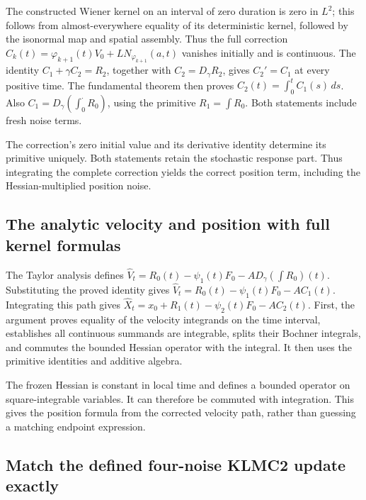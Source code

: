 \documentclass[11pt,a4paper]{report}
\begin{document}
The constructed Wiener kernel on an interval of zero duration is zero in \(L^{2}\); this follows from almost-everywhere equality of its deterministic kernel, followed by the isonormal map and spatial assembly. Thus the full correction \(C_k(t)=\varphi_{k+1}(t)V_0+L N_{\varphi_{k+1}}(a,t)\) vanishes initially and is continuous. The identity \(C_1+\gamma C_2=R_2\), together with \(C_2=D_\gamma R_2\), gives \(C_2\prime=C_1\) at every positive time. The fundamental theorem then proves \(C_2(t)=\int_0^tC_1(s)\,ds\). Also \(C_1=D_\gamma(\int_0^{\cdot}R_0)\), using the primitive \(R_1=\int R_0\). Both statements include fresh noise terms.



The correction’s zero initial value and its derivative identity determine its primitive uniquely. Both statements retain the stochastic response part. Thus integrating the complete correction yields the correct position term, including the Hessian-multiplied position noise.

\subsection{\texorpdfstring{The analytic velocity and position with full kernel formulas}{The analytic velocity and position with full kernel formulas}}
\label{report-step-KineticLangevin-CorrectedStep-lean-3}


The Taylor analysis defines \(\widehat V_t=R_0(t)-\psi_1(t)F_0-A D_\gamma(\int R_0)(t)\). Substituting the proved identity gives \(\widehat V_t=R_0(t)-\psi_1(t)F_0-AC_1(t)\). Integrating this path gives \(\widehat X_t=x_0+R_1(t)-\psi_2(t)F_0-AC_2(t)\). First, the argument proves equality of the velocity integrands on the time interval, establishes all continuous summands are integrable, splits their Bochner integrals, and commutes the bounded Hessian operator with the integral. It then uses the primitive identities and additive algebra.



The frozen Hessian is constant in local time and defines a bounded operator on square-integrable variables. It can therefore be commuted with integration. This gives the position formula from the corrected velocity path, rather than guessing a matching endpoint expression.

\subsection{\texorpdfstring{Match the defined four-noise KLMC2 update exactly}{Match the defined four-noise KLMC2 update exactly}}
\label{report-step-KineticLangevin-CorrectedStep-lean-4}
\end{document}
